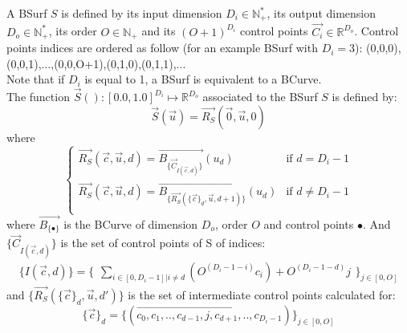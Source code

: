 \documentclass[12pt, a4paper]{article}
\begin{document}
A BSurf $S$ is defined by its input dimension $D_i\in\mathbb{N}^*_+$, its output dimension $D_o\in\mathbb{N}^*_+$, its order $O\in\mathbb{N_+}$ and its $(O+1)^{D_i}$ control points $\overrightarrow{C_i}\in\mathbb{R}^{D_o}$. Control points indices are ordered as follow (for an example BSurf with $D_i=3$): (0,0,0),(0,0,1),...,(0,0,O+1),(0,1,0),(0,1,1),... \\
Note that if $D_i$ is equal to 1, a BSurf is equivalent to a BCurve.\\
The function $\overrightarrow{S}():[0.0,1.0]^{D_i}\mapsto\mathbb{R}^{D_o}$ associated to the BSurf $S$ is defined by:\\
\begin{equation}
\overrightarrow{S}(\overrightarrow{u})=\overrightarrow{R_S}(\overrightarrow{0},\overrightarrow{u},0)
\end{equation}
where
\begin{equation}
\left\lbrace
\begin{array}{ll}
\overrightarrow{R_S}(\overrightarrow{c},\overrightarrow{u},d)=\overrightarrow{B_{\lbrace\overrightarrow{C}_{I(\overrightarrow{c},d)}\rbrace}}(u_d)&\textrm{if }d=D_i-1\\
\overrightarrow{R_S}(\overrightarrow{c},\overrightarrow{u},d)=\overrightarrow{B_{\lbrace\overrightarrow{R_S}(\lbrace\overrightarrow{c}\rbrace_d,\overrightarrow{u},d+1)\rbrace}}(u_d)&\textrm{if }d\ne D_i-1\\
\end{array}
\right.
\end{equation}
where $\overrightarrow{B_{\lbrace\bullet\rbrace}}$ is the BCurve of dimension $D_o$, order $O$ and control points $\bullet$. And $\lbrace\overrightarrow{C}_{I(\overrightarrow{c},d)}\rbrace$ is the set of control points of S of indices:\\
\begin{equation}
\lbrace I(\overrightarrow{c},d)\rbrace=\lbrace
\begin{array}{l}
\sum_{i\in[0,D_i-1]|i\ne d}\left(O^{(D_i-1-i)}c_i\right)+O^{(D_i-1-d)}j
\end{array}
\rbrace_{j\in[0,O]}
\end{equation}
and $\lbrace\overrightarrow{R_S}(\lbrace\overrightarrow{c}\rbrace_d,\overrightarrow{u},d')\rbrace$ is the set of intermediate control points calculated for:\\
\begin{equation}
\lbrace\overrightarrow{c}\rbrace_d=\lbrace(\overrightarrow{c_0,c_1,..,c_{d-1},j,c_{d+1},..,c_{D_i-1}})\rbrace_{j\in[0,O]}
\end{equation}
\end{document}
